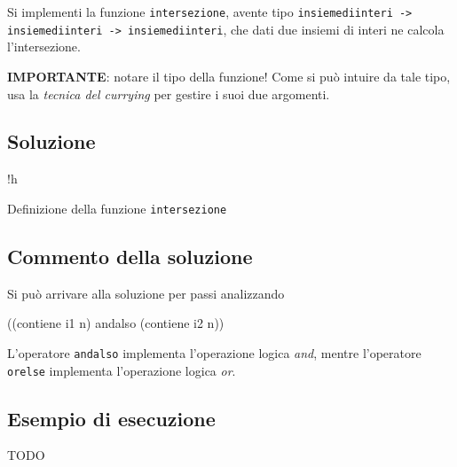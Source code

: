 Si implementi la funzione \texttt{intersezione}, avente tipo \texttt{insiemediinteri -> insiemediinteri -> insiemediinteri}, che dati due insiemi di interi ne calcola l'intersezione.

\textbf{IMPORTANTE}: notare il tipo della funzione! Come si può intuire da tale tipo, usa la \emph{tecnica del currying} per gestire i suoi due argomenti.

\subsection{Soluzione}

\begin{listing}{!h}
\caption[]{Definizione della funzione \texttt{intersezione}}
\end{listing}

\subsection{Commento della soluzione}

Si può arrivare alla soluzione per passi analizzando

\begin{smlcode}
((contiene i1 n) andalso (contiene i2 n))
\end{smlcode}

L'operatore \texttt{andalso} implementa l'operazione logica \emph{and}, mentre l'operatore \texttt{orelse} implementa l'operazione logica \emph{or}.

\subsection*{Esempio di esecuzione}

TODO
